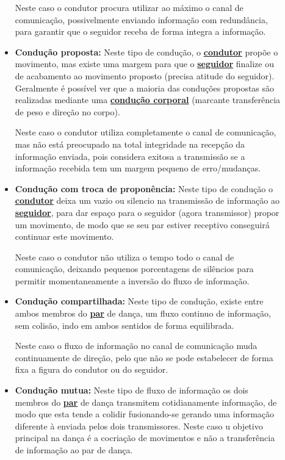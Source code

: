 \begin{description}
\begin{itemize}
    Neste caso o condutor procura utilizar ao máximo o canal de comunicação,
    possivelmente enviando informação com redundância, 
    para garantir que o seguidor receba de forma integra a informação.
    \item \textbf{Condução proposta:} 
    Neste tipo de condução, o 
    \hyperref[def:Condutor]{\textbf{condutor}} propõe o movimento,
    mas existe uma margem para que o \hyperref[def:Seguidor]{\textbf{seguidor}} 
    finalize ou de acabamento ao movimento proposto (precisa atitude do seguidor).
    Geralmente é possível ver que a maioria das conduções propostas 
    são realizadas mediante uma \hyperref[ref:conducaocorporal]{\textbf{condução corporal}} 
    (marcante transferência de peso e direção no corpo).

    Neste caso o condutor utiliza completamente o canal de comunicação,
    mas não está preocupado na total integridade na recepção da informação enviada,
    pois considera exitosa a transmissão se a informação recebida 
    tem um margem pequeno de erro/mudanças.
    \item \textbf{Condução com troca de proponência:}
    Neste tipo de condução o \hyperref[def:Condutor]{\textbf{condutor}} 
    deixa um vazio ou silencio na transmissão
    de informação ao \hyperref[def:Seguidor]{\textbf{seguidor}},
    para dar espaço para o seguidor (agora transmissor) 
    propor um movimento, de modo que se seu par estiver receptivo 
    conseguirá continuar este movimento. 


    Neste caso o condutor não utiliza o tempo todo o canal de comunicação,
    deixando pequenos porcentagens de silêncios
    para permitir momentaneamente a inversão do fluxo de informação.
    \item \textbf{Condução compartilhada:} 
    Neste tipo de condução, existe entre ambos membros do 
    \hyperref[def:Par]{\textbf{par}} de dança, 
    um fluxo continuo de informação, sem colisão, 
    indo em ambos sentidos de forma equilibrada. 
    
    Neste caso o fluxo de informação no canal de comunicação muda continuamente de direção,
    pelo que não se pode estabelecer de forma fixa a figura do condutor ou do seguidor.
    \item \textbf{Condução mutua:} Neste tipo de fluxo de informação 
    os dois membros do \hyperref[def:Par]{\textbf{par}} de dança 
    transmitem cotidianamente informação, 
    de modo que esta tende a colidir fusionando-se gerando uma informação
    diferente à enviada pelos dois transmissores.
    Neste caso u objetivo principal na dança é a cocriação de movimentos 
    e não a transferência de informação ao par de dança. 
     


\end{itemize}
\end{description}
